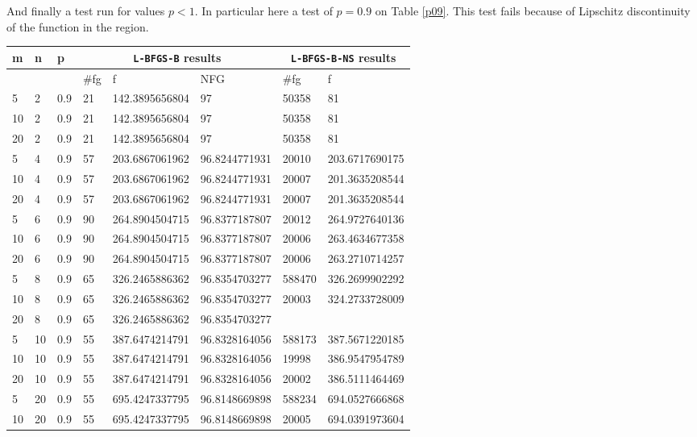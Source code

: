 And finally a test run for values $p < 1$. In particular here a test of $p = 0.9$ on Table \ref{p09}. This test fails because of Lipschitz discontinuity of the function in the region.

\begin{table}
  \begin{center}
    \footnotesize
    \begin{tabular}{|l|l|l|l|l|l|l|l|}
      \hline
m  &  n  &  p  & \multicolumn{3}{|c|}{\texttt{L-BFGS-B} results} & \multicolumn{2}{|c|}{\texttt{L-BFGS-B-NS} results} \\ \hline
& &  & \#fg & f & NFG & \#fg & f \\ \hline
      5 & 2 & 0.9 & 21 & 142.3895656804 & 97 & 50358 & 81 \\ 
      10 & 2 & 0.9 & 21 & 142.3895656804 & 97 & 50358 & 81 \\
      20 & 2 & 0.9 & 21 & 142.3895656804 & 97 & 50358 & 81\\
      5 & 4 & 0.9 & 57 & 203.6867061962 & 96.8244771931 & 20010 & 203.6717690175\\
      10 & 4 & 0.9 & 57 & 203.6867061962 & 96.8244771931 & 20007 & 201.3635208544\\
      20 & 4 & 0.9 & 57 & 203.6867061962 & 96.8244771931 & 20007 & 201.3635208544\\
      5 & 6 & 0.9 & 90 & 264.8904504715 & 96.8377187807 & 20012 & 264.9727640136\\
      10 & 6 & 0.9 & 90 & 264.8904504715 & 96.8377187807 & 20006 & 263.4634677358\\
      20 & 6 & 0.9 & 90 & 264.8904504715 & 96.8377187807 & 20006 & 263.2710714257\\
      5 & 8 & 0.9 & 65 & 326.2465886362 & 96.8354703277 & 588470 & 326.2699902292\\
      10 & 8 & 0.9 & 65 & 326.2465886362 & 96.8354703277 & 20003 & 324.2733728009\\
      20 & 8 & 0.9 & 65 & 326.2465886362 & 96.8354703277 &  & \\
      5 & 10 & 0.9 & 55 & 387.6474214791 & 96.8328164056 & 588173 & 387.5671220185\\
      10 & 10 & 0.9 & 55 & 387.6474214791 & 96.8328164056 & 19998 & 386.9547954789\\
      20 & 10 & 0.9 & 55 & 387.6474214791 & 96.8328164056 & 20002 & 386.5111464469\\
      5 & 20 & 0.9 & 55 & 695.4247337795 & 96.8148669898 & 588234 & 694.0527666868\\
      10 & 20 & 0.9 & 55 & 695.4247337795 & 96.8148669898 & 20005 & 694.0391973604\\

\end{tabular}
\end{center}
\end{table}
